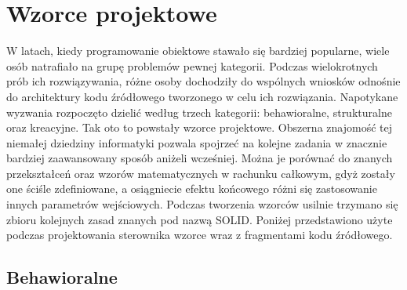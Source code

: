 \chapter{Wzorce projektowe}
W latach, kiedy programowanie obiektowe stawało się bardziej popularne, wiele osób natrafiało na grupę problemów pewnej kategorii.
Podczas wielokrotnych prób ich rozwiązywania, różne osoby dochodziły do wspólnych wniosków odnośnie do architektury kodu źródłowego tworzonego w celu ich rozwiązania.
Napotykane wyzwania rozpoczęto dzielić według trzech kategorii: behawioralne, strukturalne oraz kreacyjne. Tak oto to powstały wzorce projektowe.
Obszerna znajomość tej niemałej dziedziny informatyki pozwala spojrzeć na kolejne zadania w znacznie bardziej zaawansowany sposób aniżeli wcześniej.
Można je porównać do znanych przekształceń oraz wzorów matematycznych w rachunku całkowym, gdyż zostały one ściśle zdefiniowane, a osiągniecie efektu końcowego różni się
zastosowanie innych parametrów wejściowych. Podczas tworzenia wzorców usilnie trzymano się zbioru kolejnych zasad znanych pod nazwą SOLID. \newline
Poniżej przedstawiono użyte podczas projektowania sterownika wzorce wraz z fragmentami kodu źródłowego.
\section{Behawioralne}
